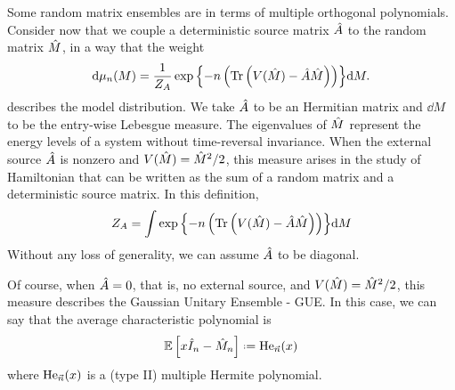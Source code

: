 Some random matrix ensembles are in terms of multiple orthogonal polynomials. Consider now that we couple a deterministic source matrix $\hat A$ to the random matrix $\hat M$, in a way that the weight
\begin{equation}
	\mathrm{d} \mu_n(M) = \frac{1}{Z_A} \exp{\left\{-n \left( \operatorname{Tr}{\left(V(\hat M)-  \hat A\hat M \right)}\right)\right\} } \mathrm{d} M.
\end{equation}
describes the model distribution. We take $\hat A$ to be an Hermitian matrix and $\dd M$ to be the entry-wise Lebesgue measure. The eigenvalues of $\hat M$ represent the energy levels of a system without time-reversal invariance. When the external source $\hat A$ is nonzero and $V(\hat M) = \hat M^2 / 2$, this measure arises in the study of Hamiltonian that can be written as the sum of a random matrix and a deterministic source matrix. In this definition,
\begin{equation}
	Z_A = \int  \exp{\left\{-n \left( \operatorname{Tr}{\left(V(\hat M)-  \hat A\hat M \right)}\right)\right\} } \mathrm{d} M
\end{equation}
Without any loss of generality, we can assume $\hat A$ to be diagonal.

Of course,  when $\hat A = 0$, that is, no external source, and $V(\hat M) = \hat M^2/2$, this measure describes the Gaussian Unitary Ensemble - GUE. In this case, we can say that the average characteristic polynomial is 
\begin{equation}
	\E\left[ x \m{I}_n - \m{M}_n\right] \deff \He_{\vec{n}}(x)
\end{equation}
where $\mathrm{He}_{\vec{n}}(x)$ is a (type II) multiple Hermite polynomial.

